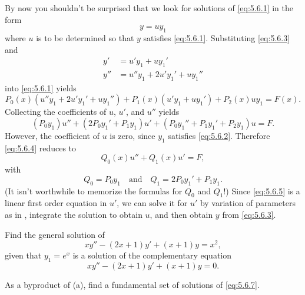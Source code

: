 By now you shouldn't be surprised that we look for
solutions of \eqref{eq:5.6.1} in the form
\begin{equation} \label{eq:5.6.3}
y=uy_1
\end{equation}
where $u$ is to be determined so that $y$ satisfies \eqref{eq:5.6.1}.
Substituting \eqref{eq:5.6.3} and
\begin{align*}
y'&= u'y_1+uy_1' \\
y''&= u''y_1+2u'y_1'+uy_1''
\end{align*}
into \eqref{eq:5.6.1} yields
\[
P_0(x)(u''y_1+2u'y_1'+uy_1'')+P_1(x)(u'y_1+uy_1')+P_2(x)uy_1=F(x).
\]
Collecting the coefficients of $u$, $u'$, and $u''$ yields
\begin{equation} \label{eq:5.6.4}
(P_0y_1)u''+(2P_0y_1'+P_1y_1)u'+(P_0y_1''+P_1y_1'+P_2y_1)
u=F.
\end{equation}
However, the coefficient of $u$ is zero, since $y_1$ satisfies
\eqref{eq:5.6.2}. Therefore \eqref{eq:5.6.4} reduces to
\begin{equation} \label{eq:5.6.5}
Q_0(x)u''+Q_1(x)u'=F,
\end{equation}
with
\[
Q_0=P_0y_1 \quad\text{and}\quad Q_1=2P_0y_1'+P_1y_1.
\]
(It isn't worthwhile to memorize the formulas for $Q_0$ and $Q_1$!)
Since \eqref{eq:5.6.5} is a linear first order equation in $u'$, we can
solve it for $u'$ by variation of parameters as in
, integrate the solution to obtain $u$, and then
obtain $y$ from \eqref{eq:5.6.3}.

\begin{example}\label{example:5.6.1}
\begin{alist}
\item %
 Find the general solution of
\begin{equation} \label{eq:5.6.6}
xy''-(2x+1)y'+(x+1)y=x^2,
\end{equation}
given that $y_1=e^x$ is a solution of the complementary equation
\begin{equation} \label{eq:5.6.7}
xy''-(2x+1)y'+(x+1)y=0.
\end{equation}
\item %
As a byproduct of (a), find a fundamental set of solutions of
\eqref{eq:5.6.7}.
\end{alist}
\end{example}

